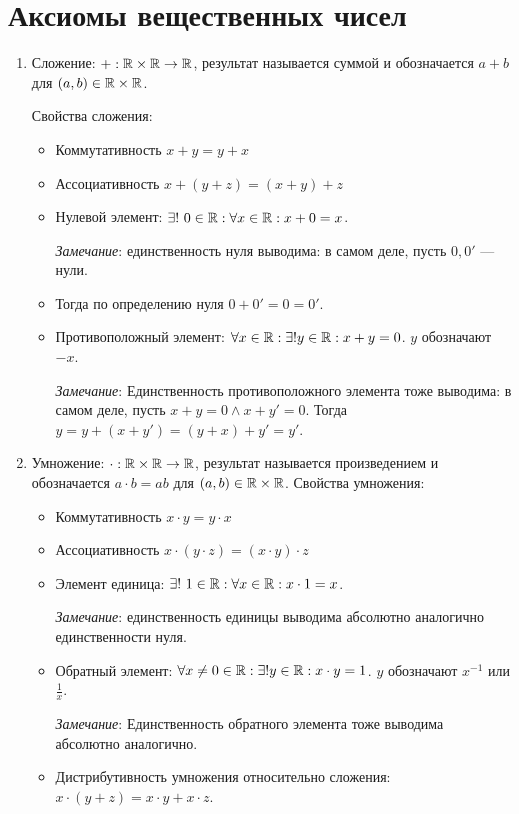 \documentclass[a4paper]{report}
\begin{document}
    \section{Аксиомы вещественных чисел}
    \begin{enumerate}
        \item Сложение: $+ : \mathbb{R} \times \mathbb{R} \rightarrow \mathbb{R}$, результат называется суммой и обозначается $a + b$ для $(a, b) \in \mathbb{R} \times \mathbb{R}$.

        Свойства сложения:
        \begin{itemize}
            \item Коммутативность $x + y = y + x$
            \item Ассоциативность $x + (y + z) = (x + y) + z$
            \item Нулевой элемент: $\exists! ~ 0 \in \mathbb{R} : \forall x \in \mathbb{R}: x + 0 = x$.

            \emph{Замечание}: единственность нуля выводима: в самом деле, пусть $0, 0'$ --- нули.
            \item Тогда по определению нуля $0 + 0' = 0 = 0'$.
            \item Противоположный элемент: $\forall x \in \mathbb{R}: \exists! y \in \mathbb{R} : x + y = 0$. $y$ обозначают $-x$.

            \emph{Замечание}: Единственность противоположного элемента тоже выводима: в самом деле, пусть $x + y = 0 \land x + y' = 0$.
            Тогда $y = y + (x + y') = (y + x) + y' = y'$.
        \end{itemize}
        \item Умножение: $\cdot: \mathbb{R} \times \mathbb{R} \rightarrow \mathbb{R}$, результат называется произведением и обозначается $ a \cdot b = ab$ для $(a, b) \in \mathbb{R} \times \mathbb{R}$.
        Свойства умножения:
        \begin{itemize}
            \item Коммутативность $x \cdot y = y \cdot x$
            \item Ассоциативность $x \cdot (y \cdot z) = (x \cdot y) \cdot z$
            \item Элемент единица: $\exists! ~ 1 \in \mathbb{R} : \forall x \in \mathbb{R}: x \cdot 1 = x$.

            \emph{Замечание}: единственность единицы выводима абсолютно аналогично единственности нуля.
            \item Обратный элемент: $\forall x \ne 0 \in \mathbb{R}: \exists! y \in \mathbb{R} : x \cdot y = 1$. $y$ обозначают $x^{-1}$ или $\frac{1}{x}$.

            \emph{Замечание}: Единственность обратного элемента тоже выводима абсолютно аналогично.
            \item Дистрибутивность умножения относительно сложения: $x \cdot (y + z) = x \cdot y + x \cdot z$.


\end{itemize}
\end{enumerate}
\end{document}
